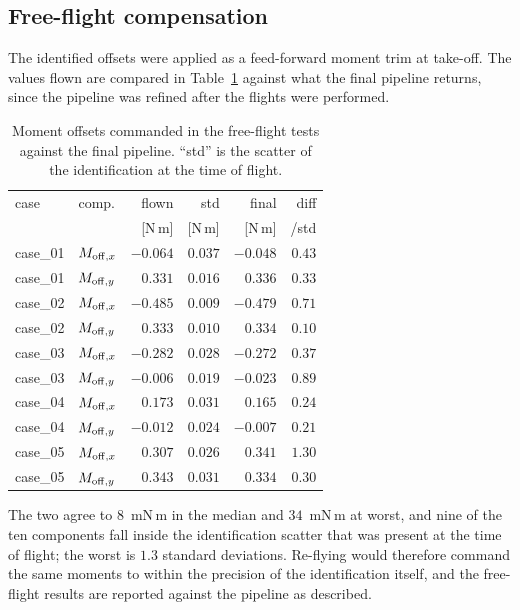 \documentclass[10pt]{article}
\begin{document}
\subsection*{Free-flight compensation}

The identified offsets were applied as a feed-forward moment trim at
take-off. The values flown are compared in Table~\ref{tab:flown}
against what the final pipeline returns, since the pipeline was
refined after the flights were performed.

\begin{table}[t]
\centering
\caption{Moment offsets commanded in the free-flight tests against the
final pipeline. ``std'' is the scatter of the identification at the
time of flight.}
\label{tab:flown}
\small
\setlength{\tabcolsep}{4pt}
\begin{tabular}{@{}ll rrr r@{}}
\hline
case & comp. & flown & std & final & diff \\
 & & [N\,m] & [N\,m] & [N\,m] & /std \\
\hline
case\_01 & $M_{{\rm off},x}$ & $-0.064$ & $0.037$ & $-0.048$ & $0.43$\\
case\_01 & $M_{{\rm off},y}$ & $0.331$  & $0.016$ & $0.336$  & $0.33$\\
case\_02 & $M_{{\rm off},x}$ & $-0.485$ & $0.009$ & $-0.479$ & $0.71$\\
case\_02 & $M_{{\rm off},y}$ & $0.333$  & $0.010$ & $0.334$  & $0.10$\\
case\_03 & $M_{{\rm off},x}$ & $-0.282$ & $0.028$ & $-0.272$ & $0.37$\\
case\_03 & $M_{{\rm off},y}$ & $-0.006$ & $0.019$ & $-0.023$ & $0.89$\\
case\_04 & $M_{{\rm off},x}$ & $0.173$  & $0.031$ & $0.165$  & $0.24$\\
case\_04 & $M_{{\rm off},y}$ & $-0.012$ & $0.024$ & $-0.007$ & $0.21$\\
case\_05 & $M_{{\rm off},x}$ & $0.307$  & $0.026$ & $0.341$  & $1.30$\\
case\_05 & $M_{{\rm off},y}$ & $0.343$  & $0.031$ & $0.334$  & $0.30$\\
\hline
\end{tabular}
\end{table}

The two agree to $8$~mN\,m in the median and $34$~mN\,m at worst, and
nine of the ten components fall inside the identification scatter that
was present at the time of flight; the worst is $1.3$ standard
deviations. Re-flying would therefore command the same moments to
within the precision of the identification itself, and the free-flight
results are reported against the pipeline as described.
\end{document}

